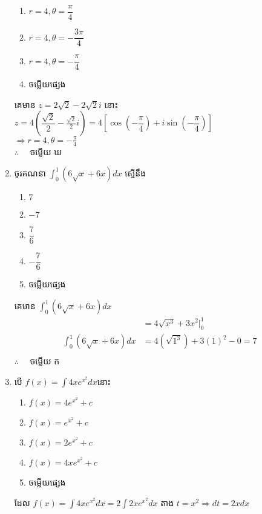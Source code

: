 \documentclass[12pt, a4paper]{article}
\begin{document}
\begin{enumerate}[m]
\begin{enumerate}[k,3]
		\item $r=4,\theta=\dfrac{\pi}{4}$
		\item $r=4,\theta=-\dfrac{3\pi}{4}$
		\item $r=4,\theta=-\dfrac{\pi}{4}$
		\item ចម្លើយផ្សេង
	\end{enumerate}
	\answer
	\begin{center}
		គេមាន $z=2\sqrt{2}-2\sqrt{2}i$ នោះ $z=4\left(\dfrac{\sqrt{2}}{2}-\frac{\sqrt{2}}{2}i\right)=4\left[\cos\left(-\dfrac{\pi}{4}\right)+i\sin\left(-\dfrac{\pi}{4}\right)\right]$\\
		$\Rightarrow r=4, \theta=-\frac{\pi}{4}$\\
		$\therefore \quad$ \kml ចម្លើយ \kbk ឃ
	\end{center}
	{\color{blue}\hrulefill}
	\item ចូរគណនា $\int_{0}^{1}\left(6\sqrt{x}+6x\right)dx$ ស្មើនឹង
	\begin{enumerate}[k,5]
		\item $7$
		\item $-7$
		\item $\dfrac{7}{6}$
		\item $-\dfrac{7}{6}$
		\item ចម្លើយផ្សេង
	\end{enumerate}
	\answer
	\begin{center}
		គេមាន $\int_{0}^{1}\left(6\sqrt{x}+6x\right)dx$\\
		\begin{align*}
		&=4\sqrt{x^3}+3x^2\bigg|_{0}^{1}\\
		\int_{0}^{1}\left(6\sqrt{x}+6x\right)dx&=4\left(\sqrt{1^3}\right)+3\left(1\right)^2-0=7\\
		\end{align*}
		$\therefore \quad$ \kml ចម្លើយ \kbk ក
	\end{center}
	{\color{blue}\hrulefill}
	\item បើ $f(x)=\int4xe^{x^2}dx$នោះ
	\begin{enumerate}[k,3]
		\item $f(x)=4e^{x^2}+c$
		\item $f(x)=e^{x^2}+c$
		\item $f(x)=2e^{x^2}+c$
		\item $f(x)=4xe^{x^2}+c$
		\item ចម្លើយផ្សេង
	\end{enumerate}
	\answer
	\begin{center}
		ដែល $f(x)=\int4xe^{x^2}dx=2\int2xe^{x^2}dx$ តាង $t = x^2 \Rightarrow dt=2xdx$\\

\end{center}
\end{enumerate}
\end{document}

